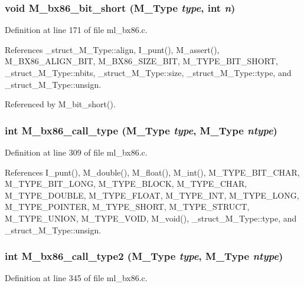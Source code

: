 \subsubsection{\setlength{\rightskip}{0pt plus 5cm}void M\_\-bx86\_\-bit\_\-short (\bf{M\_\-Type} {\em type}, int {\em n})}\label{m__bx86_8h_d3907801e3d76a8c83e73fad53eca534}




Definition at line 171 of file ml\_\-bx86.c.

References \_\-struct\_\-M\_\-Type::align, I\_\-punt(), M\_\-assert(), M\_\-BX86\_\-ALIGN\_\-BIT, M\_\-BX86\_\-SIZE\_\-BIT, M\_\-TYPE\_\-BIT\_\-SHORT, \_\-struct\_\-M\_\-Type::nbits, \_\-struct\_\-M\_\-Type::size, \_\-struct\_\-M\_\-Type::type, and \_\-struct\_\-M\_\-Type::unsign.

Referenced by M\_\-bit\_\-short().
\subsubsection{\setlength{\rightskip}{0pt plus 5cm}int M\_\-bx86\_\-call\_\-type (\bf{M\_\-Type} {\em type}, \bf{M\_\-Type} {\em ntype})}\label{m__bx86_8h_1a8ac9ccaa749230a50771322bfb0f2f}




Definition at line 309 of file ml\_\-bx86.c.

References I\_\-punt(), M\_\-double(), M\_\-float(), M\_\-int(), M\_\-TYPE\_\-BIT\_\-CHAR, M\_\-TYPE\_\-BIT\_\-LONG, M\_\-TYPE\_\-BLOCK, M\_\-TYPE\_\-CHAR, M\_\-TYPE\_\-DOUBLE, M\_\-TYPE\_\-FLOAT, M\_\-TYPE\_\-INT, M\_\-TYPE\_\-LONG, M\_\-TYPE\_\-POINTER, M\_\-TYPE\_\-SHORT, M\_\-TYPE\_\-STRUCT, M\_\-TYPE\_\-UNION, M\_\-TYPE\_\-VOID, M\_\-void(), \_\-struct\_\-M\_\-Type::type, and \_\-struct\_\-M\_\-Type::unsign.
\subsubsection{\setlength{\rightskip}{0pt plus 5cm}int M\_\-bx86\_\-call\_\-type2 (\bf{M\_\-Type} {\em type}, \bf{M\_\-Type} {\em ntype})}\label{m__bx86_8h_f8ab8b2180cd5b4b19afd1b997ddf6d7}




Definition at line 345 of file ml\_\-bx86.c.

